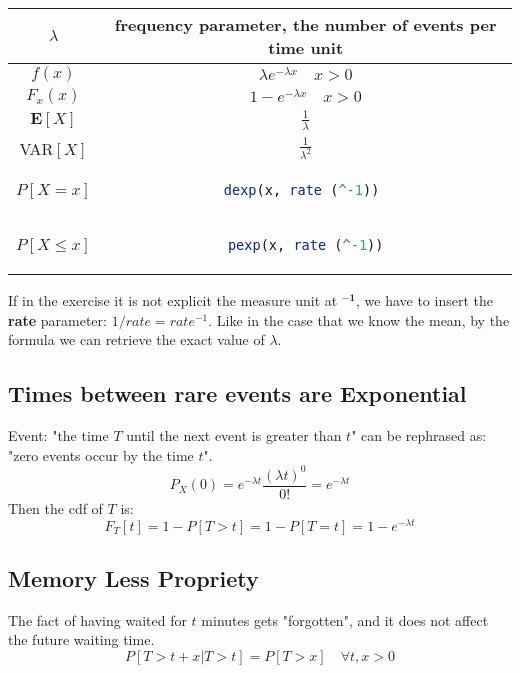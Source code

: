 \begingroup
\setlength{\tabcolsep}{10pt} %
\renewcommand{\arraystretch}{1.5} %
\begin{center}
\begin{tabular}{ |c|c| } 
\hline
\(\lambda\) & frequency parameter, the number of events per time unit \\ \hline
\(f(x)\) & $\lambda e^{-\lambda x} \quad x > 0$ \\ \hline
\(F_x(x)\) & $1 - e^{-\lambda x} \quad x > 0$ \\ \hline
\(\mathbf{E}[X]\) & \(\frac{1}{\lambda}\) \\ \hline
VAR\([X]\) & \(\frac{1}{\lambda^2}\) \\ \hline\hline
\(P[X = x]\) & \begin{lstlisting}[language=R]
dexp(x, rate (^-1)) 
\end{lstlisting} \\ \hline
\(P[X \leq x]\) & \begin{lstlisting}[language=R]
pexp(x, rate (^-1))
\end{lstlisting} \\ \hline
\end{tabular}
\end{center}
\endgroup
\begin{tcolorbox}
If in the exercise it is not explicit the measure unit at \(\mathbf{^{-1}}\), we have to insert the \textbf{rate} parameter: \(1/rate = rate^{-1}\). Like in the case that we know the mean, by the formula we can retrieve the exact value of $\lambda$.
\end{tcolorbox}

\subsection{Times between rare events are Exponential}
Event: "the time \(T\) until the next event is greater than \(t\)" can be rephrased as: "zero events occur by the time \(t\)".
\[P_X(0) = e^{-\lambda t}\frac{(\lambda t)^0}{0!} = e^{-\lambda t}\]
Then the cdf of \(T\) is:
\[F_T[t] = 1 - P[T > t] = 1- P[T = t] = 1 - e^{-\lambda t}\]

\subsection{Memory Less Propriety}
The fact of having waited for \(t\) minutes gets "forgotten", and it does not affect the future waiting time.
\[P[T > t + x | T > t] = P[T > x] \quad \forall t,x > 0\]

